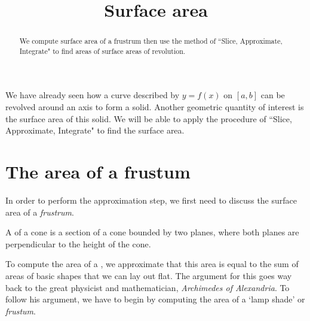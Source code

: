 \documentclass{ximera}
\title[Dig-In:]{Surface area}
\begin{document}
\begin{abstract}
We compute surface area of a frustrum then use the method of ``Slice, Approximate, Integrate" to find areas of surface areas of revolution.
\end{abstract}
\maketitle


We have already seen how a curve described by $y=f(x)$ on $[a,b]$ can be revolved around an axis to form a solid. Another geometric quantity of interest is the surface area of this solid.  We will be able to apply the procedure of ``Slice, Approximate, Integrate" to find the surface area. 
\section{The area of a frustum}
 In order to perform the approximation step, we first need to discuss the surface area of a \emph{frustrum}.

\begin{definition}
  A  of a cone is a section of a cone bounded by two
  planes, where both planes are perpendicular to the height of the
  cone.


To compute the area of a , we approximate that this area is equal to the sum of areas of basic shapes  that we can lay out flat. The argument for this goes way back to the great physicist and mathematician, \textit{Archimedes of Alexandria}. To follow his argument, we have to begin by computing the area of a `lamp shade' or \textit{frustum}.

  \begin{image}[1in]
  \end{image}
\end{definition}
\end{document}
